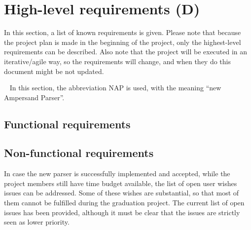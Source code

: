 \section{High-level requirements (D)}
\label{sec:requirements}
In this section, a list of known requirements is given.
Please note that because the project plan is made in the beginning of the project, only the highest-level requirements can be described.
Also note that the project will be executed in an iterative/agile way, so the requirements will change, and when they do this document might be not updated.

~\newline\noindent
In this section, the abbreviation NAP is used, with the meaning ``new Ampersand Parser''.
%

\subsection{Functional requirements}






\subsection{Non-functional requirements}

In case the new parser is successfully implemented and accepted, while the project members still have time budget available, the list of open user wishes issues can be addressed.
Some of these wishes are substantial, so that most of them cannot be fulfilled during the graduation project.
The current list of open issues has been provided\cite{open-issues}, although it must be clear that the issues are strictly seen as lower priority.
